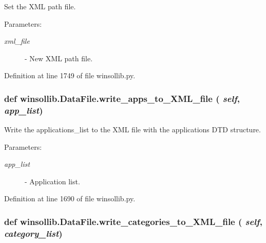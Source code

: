 Set the XML path file. 

\begin{Desc}
\item[Parameters:]
\begin{description}
\item[{\em xml\_\-file}]- New XML path file. \end{description}
\end{Desc}


Definition at line 1749 of file winsollib.py.\hypertarget{classwinsollib_1_1DataFile_ec7a45f4fc3069f7da870bc41e27963f}{
\subsubsection[write\_\-apps\_\-to\_\-XML\_\-file]{\setlength{\rightskip}{0pt plus 5cm}def winsollib.Data\-File.write\_\-apps\_\-to\_\-XML\_\-file ( {\em self},  {\em app\_\-list})}}
\label{classwinsollib_1_1DataFile_ec7a45f4fc3069f7da870bc41e27963f}


Write the applications\_\-list to the XML file with the applications DTD structure. 

\begin{Desc}
\item[Parameters:]
\begin{description}
\item[{\em app\_\-list}]- Application list. \end{description}
\end{Desc}


Definition at line 1690 of file winsollib.py.\hypertarget{classwinsollib_1_1DataFile_43018e66b71925ff9050c17e733b7308}{
\subsubsection[write\_\-categories\_\-to\_\-XML\_\-file]{\setlength{\rightskip}{0pt plus 5cm}def winsollib.Data\-File.write\_\-categories\_\-to\_\-XML\_\-file ( {\em self},  {\em category\_\-list})}}
\label{classwinsollib_1_1DataFile_43018e66b71925ff9050c17e733b7308}



